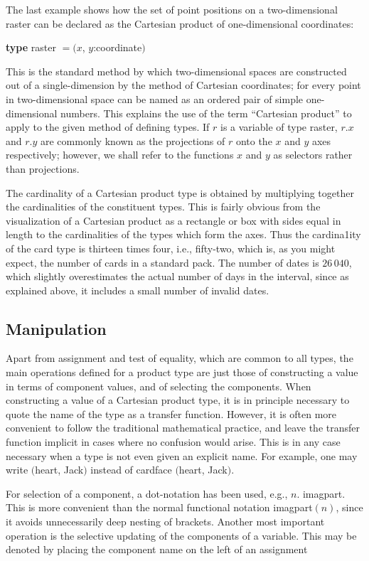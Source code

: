 \documentclass[twoside,11pt]{book}
\begin{document}
The last example shows how the set of point positions on a two-dimensional raster can be declared as the Cartesian product of one-dimensional coordinates:

\quad \textbf{type} raster $= (x$, $y$:coordinate$)$

This is the standard method by which two-dimensional spaces are constructed out of a single-dimension by the method of Cartesian coordinates; for every point in two-dimensional space can be named as an ordered pair of simple one-dimensional numbers. This explains the use of the term ``Cartesian product'' to apply to the given method of defining types. If $r$ is a variable of type raster, $r.x$ and $r.y$ are commonly known as the projections of $r$ onto the $x$ and $y$ axes respectively; however, we shall refer to the functions $x$ and $y$ as selectors rather than projections.

The cardinality of a Cartesian product type is obtained by multiplying together the cardinalities of the constituent types. This is fairly obvious from the visualization of a Cartesian product as a rectangle or box with sides equal in length to the cardinalities of the types which form the axes. Thus the cardina1ity of the card type is thirteen times four, i.e., fifty-two, which is, as you might expect, the number of cards in a standard pack. The number of dates is $26\,040$, which slightly overestimates the actual number of days in the interval, since as explained above, it includes a small number of invalid dates.

\subsection{Manipulation}

Apart from assignment and test of equality, which are common to all types, the main operations defined for a product type are just those of constructing a value in terms of component values, and of selecting the components. When constructing a value of a Cartesian product type, it is in principle necessary to quote the name of the type as a transfer function. However, it is often more convenient to follow the traditional mathematical practice, and leave the transfer function implicit in cases where no confusion would arise. This is in any case necessary when a type is not even given an explicit name. For example, one may write $($heart, Jack$)$ instead of cardface $($heart, Jack$)$.

For selection of a component, a dot-notation has been used, e.g., $n$. imagpart. This is more convenient than the normal functional notation imagpart$(n)$, since it avoids unnecessarily deep nesting of brackets. Another most important operation is the selective updating of the components of a variable. This may be denoted by placing the component name on the left of an assignment
\end{document}
